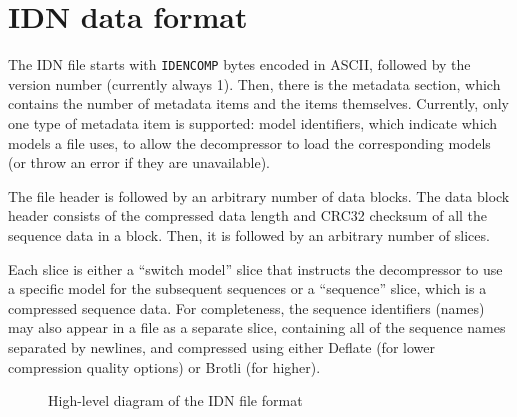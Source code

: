 \section{IDN data format}\label{sec:idn-data-format}

The IDN file starts with \texttt{IDENCOMP} bytes encoded in ASCII, followed
by the version number (currently always 1).
Then, there is the metadata section, which contains the number of metadata
items and the items themselves.
Currently, only one type of metadata item is supported: model identifiers,
which indicate which models a file uses, to allow the decompressor to load
the corresponding models (or throw an error if they are unavailable).

The file header is followed by an arbitrary number of data blocks.
The data block header consists of the compressed data length and
CRC32\cite{rfc3385} checksum of all the sequence data in a block.
Then, it is followed by an arbitrary number of slices.

Each slice is either a ``switch model'' slice that instructs the decompressor
to use a specific model for the subsequent sequences or a ``sequence'' slice,
which is a compressed sequence data.
For completeness, the sequence identifiers (names) may also appear in a file
as a separate slice, containing all of the sequence names separated by
newlines, and compressed using either Deflate (for lower compression quality
options) or Brotli (for higher).

\begin{figure}[!ht]
    \centering
    
    \caption{%
        High-level diagram of the IDN file format
    }
    \label{fig:idn-file-format}
\end{figure}
